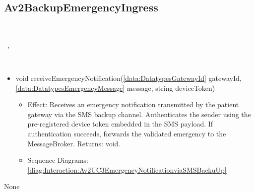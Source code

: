   \subsection{Av2BackupEmergencyIngress}\label{int:InterfacesAv2BackupEmergencyIngress}
    \begin{description}
      \item[Provided by:] \iconcomponent{}~
      \item[Required by:] \iconcomponent{}~, \iconcomponent{}~ 
      \item[Operations:] ~
    \begin{itemize}[noitemsep,nolistsep,leftmargin=-.25cm]
      \item \textsf{void receiveEmergencyNotification(\ref{data:DatatypesGatewayId} gatewayId, \ref{data:DatatypesEmergencyMessage} message, string deviceToken)}
        \begin{itemize}[noitemsep,nolistsep]
           \item Effect: Receives an emergency notification transmitted by the patient gateway via the SMS backup channel. Authenticates the sender using the pre-registered device token embedded in the SMS payload. If authentication succeeds, forwards the validated emergency to the MessageBroker. Returns: void. 
           \item Sequence Diagrams: \cref{diag:Interaction:Av2UC3EmergencyNotificationviaSMSBackuUp}
        \end{itemize}
    \end{itemize}
      \item[Diagrams:] None
    \end{description}

